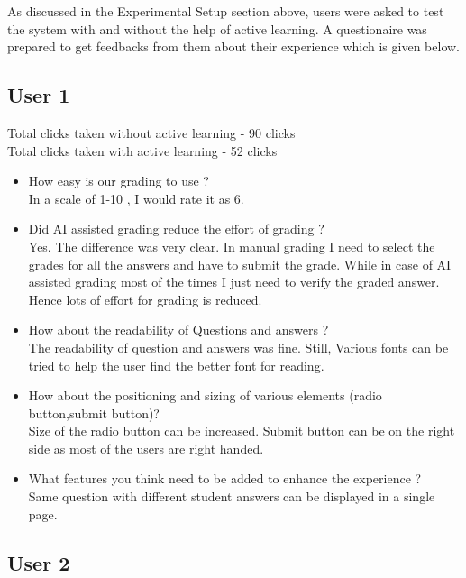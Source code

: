 As discussed in the Experimental Setup section above, users were asked to test the system with and without the help of active learning. A questionaire was prepared to get feedbacks from them about their experience which is given below. 

\newpage
\subsection{User 1}

Total clicks taken without active learning - 90 clicks \\
Total clicks taken with active learning - 52 clicks
\begin{itemize}
\item How easy is our grading to use ? \\
In a scale of 1-10 , I would rate it as 6. 
\item Did AI assisted grading reduce the effort of grading ? \\
Yes. The difference was very clear. In manual grading I need to select the grades for all the answers and have to submit the grade. While in case of AI assisted grading most of the times I just need to verify the graded answer. Hence lots of effort for grading is reduced.
\item How about the readability of Questions and answers ? \\
The readability of question and answers was fine. Still, Various fonts can be tried to help the user find the better font for reading.
\item How about the positioning and sizing of various elements (radio button,submit button)? \\
Size of the radio button can be increased. Submit button can be on the right side as most of the users are right handed. 
\item What features you think need to be added to enhance the experience ? \\
Same question with different student answers can be displayed in a single page.
\end{itemize}

\subsection{User 2}

